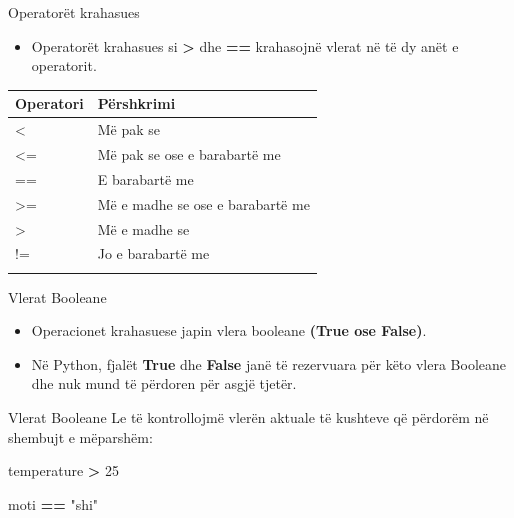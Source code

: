 \documentclass[
  ignorenonframetext,
]{beamer}
\newenvironment{Shaded}{\begin{snugshade}}{\end{snugshade}}
\newcommand{\DecValTok}[1]{\textcolor[rgb]{0.00,0.00,0.81}{#1}}
\newcommand{\NormalTok}[1]{#1}
\newcommand{\OperatorTok}[1]{\textcolor[rgb]{0.81,0.36,0.00}{\textbf{#1}}}
\newcommand{\StringTok}[1]{\textcolor[rgb]{0.31,0.60,0.02}{#1}}
\providecommand{\tightlist}{%
  \setlength{\itemsep}{0pt}\setlength{\parskip}{0pt}}
\begin{document}
\begin{frame}{Operatorët krahasues}
\protect\hypertarget{operatoruxebt-krahasues}{}
\begin{itemize}
\tightlist
\item
  Operatorët krahasues si \textbf{\textgreater{}} dhe \textbf{==}
  krahasojnë vlerat në të dy anët e operatorit.
\end{itemize}

\begin{longtable}[]{@{}ll@{}}
\toprule\noalign{}
Operatori & Përshkrimi \\
\midrule\noalign{}
\endhead
\textless{} & Më pak se \\
\textless= & Më pak se ose e barabartë me \\
== & E barabartë me \\
\textgreater= & Më e madhe se ose e barabartë me \\
\textgreater{} & Më e madhe se \\
!= & Jo e barabartë me \\
\bottomrule\noalign{}
\end{longtable}
\end{frame}

\begin{frame}{Vlerat Booleane}
\protect\hypertarget{vlerat-booleane}{}
\begin{itemize}
\item
  Operacionet krahasuese japin vlera booleane \textbf{(True ose False)}.
\item
  Në Python, fjalët \textbf{True} dhe \textbf{False} janë të rezervuara
  për këto vlera Booleane dhe nuk mund të përdoren për asgjë tjetër.
\end{itemize}
\end{frame}

\begin{frame}[fragile]{Vlerat Booleane}
\protect\hypertarget{vlerat-booleane-1}{}
Le të kontrollojmë vlerën aktuale të kushteve që përdorëm në shembujt e
mëparshëm:

\begin{Shaded}
\begin{Highlighting}[]
\NormalTok{temperature }\OperatorTok{\textgreater{}} \DecValTok{25}

\NormalTok{moti }\OperatorTok{==} \StringTok{"shi"}
\end{Highlighting}
\end{Shaded}
\end{frame}
\end{document}
